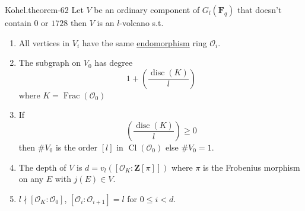 \documentclass[10pt,]{book}
\numberwithin{equation}{section}
\newcommand{\lb}{[}
\newcommand{\rb}{]}
\newcommand{\ZZ}{\mathbf{Z}}
\newcommand{\FF}{\mathbf{F}}
\newcommand{\ints}{\mathcal{O}}
\DeclareMathOperator{\Cl}{Cl}
\DeclareMathOperator{\disc}{disc}
\DeclareMathOperator{\Frac}{Frac}
\newcommand{\lt}{<}
\begin{document}
\begin{theorem}{Kohel.}{}{theorem-62}%
\hypertarget{p-818}{}%
Let \(V\) be an ordinary component of \(G_l(\FF_q)\) that doesn't contain \(0\) or \(1728\) then \(V\) is an \(l\)-volcano s.t.\leavevmode%
\begin{enumerate}
\item\hypertarget{li-201}{}All vertices in \(V_i\) have the same \hyperref[def-supersing-isog-endo]{endomorphism} ring \(\ints_i\).%
\item\hypertarget{li-202}{}The subgraph on \(V_0\) has degree%
\begin{equation*}
1+ \left(\frac {\disc(K)}{l}\right)
\end{equation*}
where \(K = \Frac(\ints_0)\)%
\item\hypertarget{li-203}{}If%
\begin{equation*}
\left(\frac {\disc(K)}{l}\right) \ge 0
\end{equation*}
then \(\#V_0\) is the order \(\lb l \rb\) in \(\Cl (\ints_0)\) else \(\#V_0 = 1\).%
\item\hypertarget{li-204}{}The depth of \(V\) is \(d = v_l (\lb \ints_K : \ZZ\lb\pi \rb\rb)\) where \(\pi\) is the Frobenius morphism on any \(E\) with \(j(E) \in V\).%
\item\hypertarget{li-205}{}\(l \nmid \lb \ints_K : \ints_0 \rb\), \(\lb \ints_i : \ints_{i+1}\rb = l\) for \(0\le i \lt d\).%
\end{enumerate}
%
\end{theorem}
%
%
\typeout{************************************************}
\typeout{************************************************}
%
\end{document}
